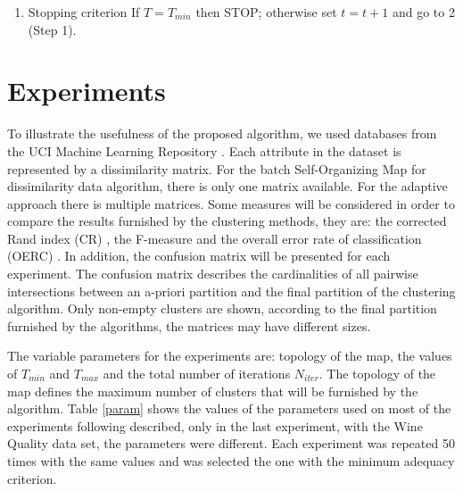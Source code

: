 \documentclass[10pt, conference, compsocconf]{IEEEtran}
\begin{document}
\begin{enumerate}
\item Stopping criterion
If $T = T_{min}$ then STOP; otherwise set $t = t+1$ and go to 2 (Step 1).

\end{enumerate}

\section{Experiments}\label{sec:experiments}

To illustrate the usefulness of the proposed algorithm, we used databases from the UCI Machine Learning Repository \cite{Frank:2010}. Each attribute in the dataset is represented by a dissimilarity matrix. For the batch Self-Organizing Map for dissimilarity data algorithm, there is only one matrix available. For the adaptive approach there is multiple matrices. Some measures will be considered in order to compare the results furnished by the clustering methods, they are: the corrected Rand index (CR) \cite{Hubert:1985}, the F-measure \cite{Rijsbergen:1979} and the overall error rate of classification (OERC) \cite{Breiman:1984}. In addition, the confusion matrix will be presented for each experiment. The confusion matrix describes the cardinalities of all pairwise intersections between an a-priori partition and the final partition of the clustering algorithm. Only non-empty clusters are shown, according to the final partition furnished by the algorithms, the matrices may have different sizes.


The variable parameters for the experiments are: topology of the map, the values of $T_{min}$ and $T_{max}$ and the total number of iterations $N_{iter}$. The topology of the map defines the maximum number of clusters that will be furnished by the algorithm. Table \ref{param} shows the values of the parameters used on most of the experiments following described, only in the last experiment, with the Wine Quality data set, the parameters were different. Each experiment was repeated 50 times with the same values and was selected the one with the minimum adequacy criterion.
\end{document}
